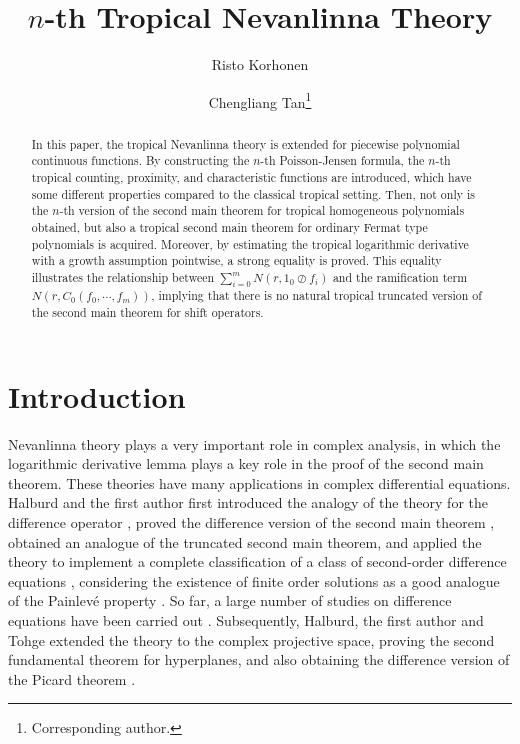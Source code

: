 \documentclass{article}
\title{$n$-th Tropical Nevanlinna Theory}
\author[1]{Risto Korhonen}
\author[1,2]{Chengliang Tan\thanks{Corresponding author.}}
\affil[1]{Department of Physics and Mathematics, University of Eastern Finland, P.O. Box 111, FI-80101 Joensuu, Finland}
\affil[2]{Beijing International Center for Mathematical Research, Peking
University, 100871 Beijing, China.
}
\begin{document}
\date{}
\maketitle
\let\thefootnote\relax{}
\let\thefootnote\relax{}
\let\thefootnote\relax{}
\let\thefootnote\relax{}

\begin{abstract}
In this paper, the tropical Nevanlinna theory is extended for piecewise polynomial continuous functions. By constructing the $n$-th Poisson-Jensen formula, the $n$-th tropical counting, proximity, and characteristic functions are introduced, which have some different properties compared to the classical tropical setting. Then, not only is the $n$-th version of the second main theorem for tropical homogeneous polynomials obtained, but also a tropical second main theorem for ordinary Fermat type polynomials is acquired.
Moreover, by estimating the tropical logarithmic derivative with a growth assumption pointwise, a strong equality is proved.
This equality illustrates the relationship between $\sum_{i=0}^{m}N(r, 1_{0}\oslash f_{i})$ and the ramification term $N(r, C_{0}(f_{0}, \cdots, f_{m}))$, implying that there is no natural tropical truncated version of the second main theorem for shift operators.\end{abstract}
\baselineskip14pt

\section{Introduction}
Nevanlinna theory plays a very important role in complex analysis, in which the logarithmic derivative lemma plays a key role in the proof of the second main theorem. These theories have many applications in complex differential equations. Halburd and the first author first introduced the analogy of the theory for the difference operator \cite{Ndi}, proved the difference version of the second main theorem \cite{Dif}, obtained an analogue of the truncated second main theorem, and applied the theory to implement a complete classification of a class of second-order difference equations \cite{Sec}, considering the existence of finite order solutions as a good analogue of the Painlev\'e property \cite{Pai}. So far, a large number of studies on difference equations have been carried out \cite{Del, Fir}. Subsequently, Halburd, the first author and Tohge extended the theory to the complex projective space, proving the second fundamental theorem for hyperplanes, and also obtaining the difference version of the Picard theorem \cite{Hyp}.
\end{document}

